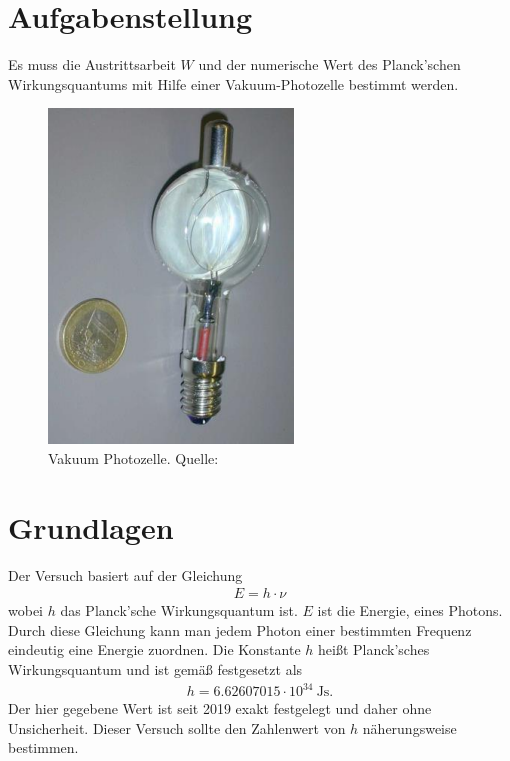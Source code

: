 \documentclass{article}
\begin{document}
\parindent0cm




\tableofcontents
\newpage

\pagestyle{fancy}

\section{Aufgabenstellung}

Es muss die Austrittsarbeit $W$ und der numerische Wert des Planck'schen Wirkungsquantums mit Hilfe einer Vakuum-Photozelle bestimmt werden. 

\begin{figure}[H]
\includegraphics[scale=1.4]{versuch3.png}
\caption{Vakuum Photozelle. Quelle: \cite{moodle}}
\end{figure}

\section{Grundlagen}

Der Versuch basiert auf der Gleichung
\begin{align}
E = h\cdot \nu\label{eq:planck}
\end{align}
wobei $h$ das Planck'sche Wirkungsquantum ist. $E$ ist die Energie, eines Photons. Durch diese Gleichung kann man jedem Photon einer bestimmten Frequenz eindeutig eine Energie zuordnen. Die Konstante $h$ heißt Planck'sches Wirkungsquantum und ist gemäß \cite{wikipedia} festgesetzt als 
\begin{align}
h=6.62607015\cdot10^{34}~\text{Js}.
\end{align}
Der hier gegebene Wert ist seit 2019 exakt festgelegt und daher ohne Unsicherheit. Dieser Versuch sollte den Zahlenwert von $h$ näherungsweise bestimmen. 
\end{document}
